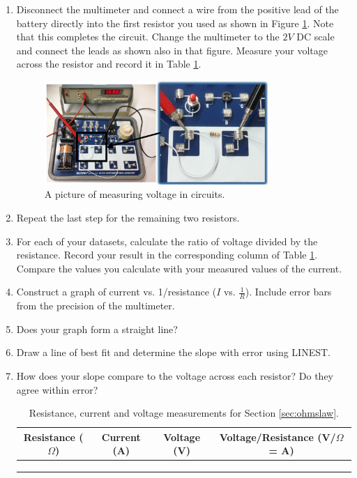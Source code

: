 \begin{enumerate}
	\item Disconnect the multimeter and connect a wire from the positive lead of the battery directly into the first resistor you used as shown in Figure \ref{fig:voltpic}. Note that this completes the circuit. Change the multimeter to the $2V$ DC scale and connect the leads as shown also in that figure. Measure your voltage across the resistor and record it in Table \ref{tab:ohmslaw}.

	\begin{figure}[h]
	\centering
	\includegraphics[width=0.8\textwidth]{./Exp2/pic/voltpic.png}
	\caption{A picture of measuring voltage in circuits.}
	\label{fig:voltpic}
	\end{figure}

	\item Repeat the last step for the remaining two resistors.

	\item For each of your datasets, calculate the ratio of voltage divided by the resistance. Record your result in the corresponding column of Table \ref{tab:ohmslaw}. Compare the values you calculate with your measured values of the current.

	\item Construct a graph of current vs. 1/resistance ($I$ vs. $\frac{1}{R}$). Include error bars from the precision of the multimeter.

	\item Does your graph form a straight line?

	\item Draw a line of best fit and determine the slope with error using LINEST.

	\item How does your slope compare to the voltage across each resistor? Do they agree within error?

\begin{table}
\begin{center}
\begin{tabular}{| c | c | c | c |}
\hline
	Resistance ($\Omega$) & Current (A) & Voltage (V) & Voltage/Resistance (V/$\Omega$ = A) \\
	\hline
	& & & \\
	\hline
	& & & \\
	\hline
	& & & \\
	\hline
\end{tabular}
\end{center}
\caption{Resistance, current and voltage measurements for Section \ref{sec:ohmslaw}.}
\label{tab:ohmslaw}
\end{table}

\end{enumerate}

